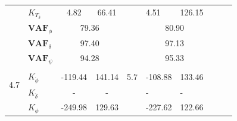 \begin{table}[]
\begin{tabular}{llcc|llllll}
                                                 & $K_{T_\delta}$        & 4.82                                       & 66.41                                                &                                              & 4.51                   & 126.15                          &  &  &  \\ \cline{2-4} \cline{6-7}
                                                 & $\mathbf{VAF}_\phi$   & \multicolumn{2}{c|}{79.36}                                                                        &                                              & \multicolumn{2}{c}{80.90}                                &  &  &  \\
                                                 & $\mathbf{VAF}_\delta$ & \multicolumn{2}{c|}{97.40}                                                                        &                                              & \multicolumn{2}{c}{97.13}                                &  &  &  \\
                                                 & $\mathbf{VAF}_\psi$   & \multicolumn{2}{c|}{94.28}                                                                        &                                              & \multicolumn{2}{c}{95.33}                                &  &  &  \\
                                                 &                       & \multicolumn{1}{l}{}                       & \multicolumn{1}{l|}{}                                &                                              &                        &                                 &  &  &  \\ \cline{1-7}
    \multirow{2}{*}{4.7}                         & $K_{\dot{\phi}} $     & -119.44                                    & 141.14                                               & 5.7                                          & -108.88                & 133.46                          &  &  &  \\
                                                 & $K_{\dot{\delta}}$    & -                                          & -                                                    &                                              & -                      & -                               &  &  &  \\
                                                 & $K_{\phi} $           & -249.98                                    & 129.63                                               &                                              & -227.62                & 122.66                          &  &  &  \\

\end{tabular}
\end{table}
